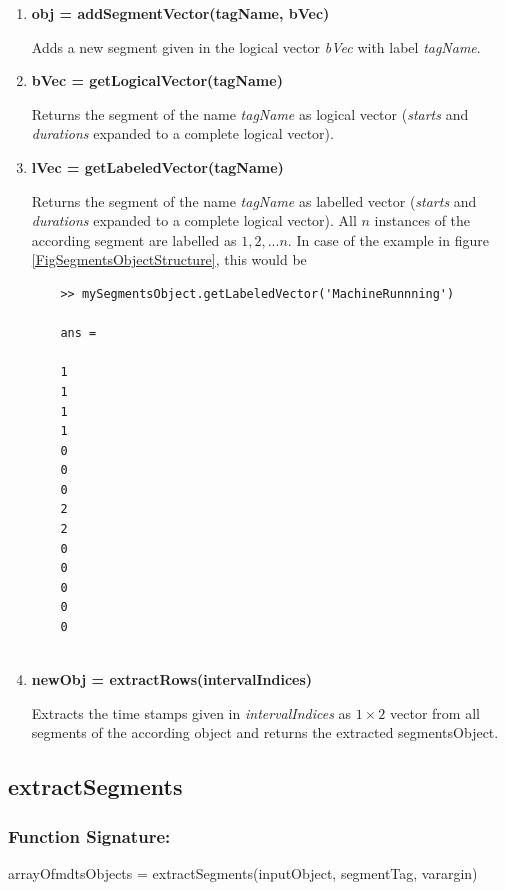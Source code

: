 \documentclass[a4]{scrreprt}
\begin{document}
\begin{enumerate}
	
	\item \textbf{obj = addSegmentVector(tagName, bVec)}
	
	Adds a new segment given in the logical vector \textit{bVec} with label \textit{tagName}.
	
	\item \textbf{bVec = getLogicalVector(tagName)}
	
	Returns the segment of the name \textit{tagName} as logical vector (\textit{starts} and \textit{durations} expanded to a complete logical vector).
	
	\item \textbf{lVec = getLabeledVector(tagName)}
	
	Returns the segment of the name \textit{tagName} as labelled vector (\textit{starts} and \textit{durations} expanded to a complete logical vector). All $n$ instances of the according segment are labelled as $1, 2, ... n$. In case of the example in figure \ref{FigSegmentsObjectStructure}, this would be 
	
	\begin{verbatim}
	>> mySegmentsObject.getLabeledVector('MachineRunnning')
	
	ans = 
	
	1 
	1 
	1 
	1 
	0 
	0
	0
	2
	2
	0
	0
	0
	0
	0
	
	\end{verbatim}
	
	\item \textbf{newObj = extractRows(intervalIndices)}
	
	Extracts the time stamps given in \textit{intervalIndices} as $1 \times 2$ vector from all segments of the according object and returns the extracted segmentsObject.
	
\end{enumerate}

\subsection{extractSegments}

\subsubsection{Function Signature:}

\begin{center}
	arrayOfmdtsObjects = extractSegments(inputObject, segmentTag, varargin)
\end{center}
\end{document}
